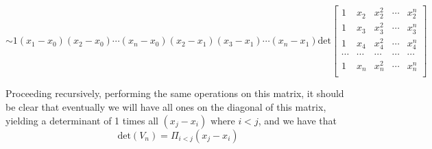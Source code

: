 \documentclass[letterpaper,12pt]{article}
\theoremstyle{definition}
\begin{document}
\[
\sim
1(x_1-x_0)(x_2-x_0)\cdots(x_n - x_0)(x_2 -x_1)(x_3 - x_1) \cdots (x_n - x_1)\text{det}
\begin{bmatrix}
    1 & x_2 & x_2^2 &\cdots &x_2^n\\
    1 & x_3 & x_3^2 &\cdots &x_3^n\\
    1 & x_4 & x_4^2 &\cdots &x_4^n\\
    \cdots&\cdots&\cdots &\cdots &\cdots\\
    1 & x_n & x_n^2 &\cdots &x_n^n\\
\end{bmatrix}
\]

Proceeding recursively, performing the same operations on this matrix, it should be clear that eventually we will have all ones on the diagonal of this matrix, yielding a determinant of 1 times all $(x_j - x_i) \text{ where } i<j$, and we have that
\[\text{det}(V_n) = \Pi_{i<j} (x_j - x_i)\]
\end{document}
